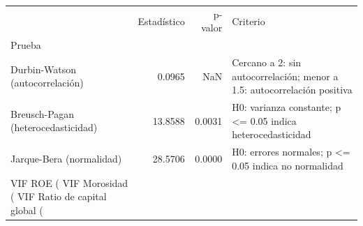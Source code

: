 \begin{tabular}{lrrl}
\toprule
 & Estadístico & p-valor & Criterio \\
Prueba &  &  &  \\
\midrule
Durbin-Watson (autocorrelación) & 0.0965 & NaN & Cercano a 2: sin autocorrelación; menor a 1.5: autocorrelación positiva \\
Breusch-Pagan (heterocedasticidad) & 13.8588 & 0.0031 & H0: varianza constante; p <= 0.05 indica heterocedasticidad \\
Jarque-Bera (normalidad) & 28.5706 & 0.0000 & H0: errores normales; p <= 0.05 indica no normalidad \\
VIF ROE (%
VIF Morosidad (%
VIF Ratio de capital global (%
\bottomrule
\end{tabular}
